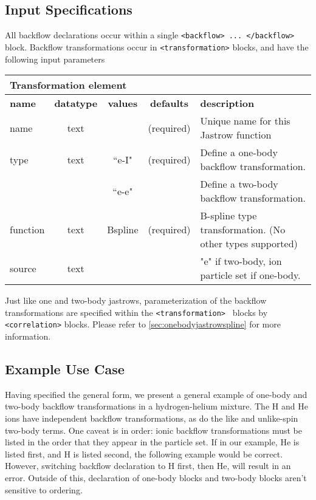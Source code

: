 \subsection{Input Specifications}
All backflow declarations occur within a single \texttt{<backflow> ... </backflow>} block.  Backflow transformations occur in \texttt{<transformation>} blocks, and have the following input parameters

\begin{table}[h]
\begin{center}
\begin{tabular}{l c c c l }
\hline
\multicolumn{5}{l}{Transformation element} \\
\hline
\bfseries name & \bfseries datatype & \bfseries values & \bfseries defaults  & \bfseries description \\
\hline
name & text &  & (required) & Unique name for this Jastrow function \\
type & text & ``e-I" & (required) & Define a one-body backflow transformation. \\ 
        &          & ``e-e" & & Define a two-body backflow transformation. \\
function & text & Bspline & (required) & B-spline type transformation. (No other types supported) \\
source & text &  &  & "e" if two-body, ion particle set if one-body.\\ 
  \hline
\end{tabular}
\end{center}
\end{table}

Just like one and two-body jastrows, parameterization of the backflow transformations are specified within the \texttt{<transformation> } blocks by  \texttt{<correlation>} blocks.  Please refer to \ref{sec:onebodyjastrowspline} for more information.

\subsection{Example Use Case}
Having specified the general form, we present a general example of one-body and two-body backflow transformations in a hydrogen-helium mixture.  The H and He ions have independent backflow transformations, as do the like and unlike-spin two-body terms.  One caveat is in order:  ionic backflow transformations must be listed in the order that they appear in the particle set.  If in our example, He is listed first, and H is listed second, the following example would be correct.  However, switching backflow declaration to H first, then He, will result in an error.  Outside of this, declaration of one-body blocks and two-body blocks aren't sensitive to ordering.  

